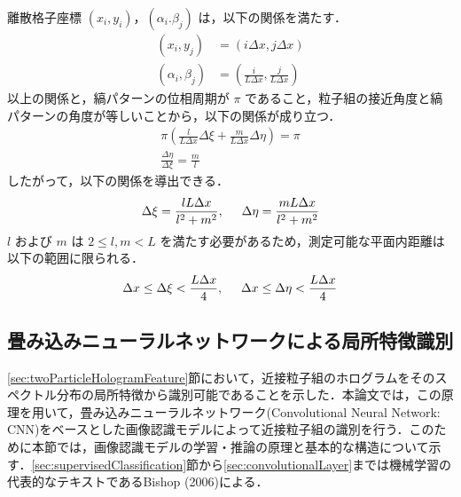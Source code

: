 離散格子座標 $(x_i,y_i)$，$(\alpha_i.\beta_j)$ は，以下の関係を満たす．
\begin{align}
    \left( x_i, y_j \right) &= \left( i \Delta x, j \Delta x \right) \\
    \left( \alpha_i, \beta_j \right) &= \left( \frac{i}{L\Delta x}, \frac{j}{L\Delta x} \right)
\end{align}
以上の関係と，縞パターンの位相周期が $\pi$ であること，粒子組の接近角度と縞パターンの角度が等しいことから，以下の関係が成り立つ．
\begin{gather}
    \pi \left( \frac{l}{L\Delta x} \Delta \xi + \frac{m}{L\Delta x} \Delta \eta \right) = \pi \\
    \frac{\Delta \eta}{\Delta \xi} = \frac{m}{l}
\end{gather}
したがって，以下の関係を導出できる\cite{aem2023}．
\begin{equation}
    \label{th:stripepattern}
    \Delta \xi = \frac{lL\Delta x}{l^2+m^2}, \hspace{5mm} \Delta \eta = \frac{m L\Delta x}{l^2+m^2}
\end{equation}
$l$ および $m$ は $2 \leq l, m < L$ を満たす必要があるため，測定可能な平面内距離は以下の範囲に限られる．
\begin{equation}
    \Delta x \leq \Delta \xi < \frac{L\Delta x}{4}, \hspace{5mm} \Delta x \leq \Delta \eta < \frac{L\Delta x}{4}
\end{equation}

\subsection{畳み込みニューラルネットワークによる局所特徴識別}\label{sec:convolutionalNeuralNetwork}
\ref{sec:twoParticleHologramFeature}節において，近接粒子組のホログラムをそのスペクトル分布の局所特徴から識別可能であることを示した．本論文では，この原理を用いて，畳み込みニューラルネットワーク(Convolutional Neural Network: CNN)\cite{lecun1998}をベースとした画像認識モデルによって近接粒子組の識別を行う．このために本節では，画像認識モデルの学習・推論の原理と基本的な構造について示す．\ref{sec:supervisedClassification}節から\ref{sec:convolutionalLayer}までは機械学習の代表的なテキストであるBishop (2006)による\cite{bishop2006}．

